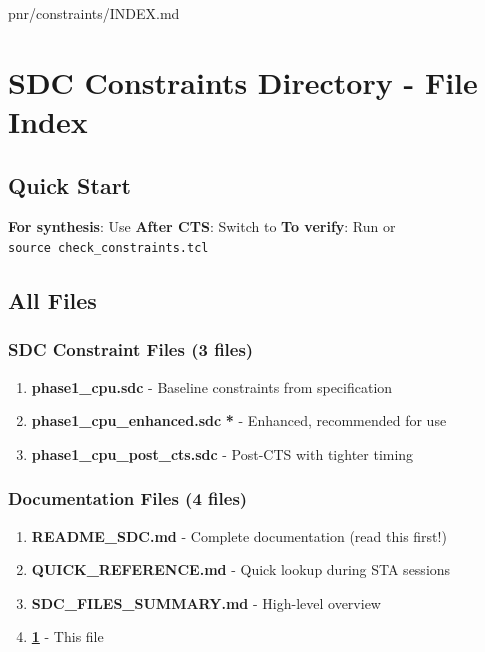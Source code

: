 \begin{relocated}{pnr/constraints/INDEX.md}
\section{SDC Constraints Directory - File Index}\label{tm:pd:constraints-index}

\subsection{Quick Start}\label{tm:pd:constraints-index:quick-start}

\textbf{For synthesis}: Use  \textbf{After
CTS}: Switch to  \textbf{To verify}: Run
 or
\texttt{source\ check\_\allowbreak{}constraints.\allowbreak{}tcl}

\subsection{All Files}\label{tm:pd:constraints-index:all-files}

\subsubsection{SDC Constraint Files (3 files)}\label{tm:pd:constraints-index:sdc-constraint-files-3-files}

\begin{enumerate}
\def\labelenumi{\arabic{enumi}.}
\tightlist
\item
  \textbf{phase1\_\allowbreak{}cpu.sdc} - Baseline constraints from
  specification
\item
  \textbf{phase1\_\allowbreak{}cpu\_\allowbreak{}enhanced.sdc}
  \textbf{*} - Enhanced, recommended for use
\item
  \textbf{phase1\_\allowbreak{}cpu\_\allowbreak{}post\_\allowbreak{}cts.sdc}
  - Post-CTS with tighter timing
\end{enumerate}

\subsubsection{Documentation Files (4 files)}\label{tm:pd:constraints-index:documentation-files-4-files}

\begin{enumerate}
\def\labelenumi{\arabic{enumi}.}
\setcounter{enumi}{3}
\tightlist
\item
  \textbf{README\_\allowbreak{}SDC.md} - Complete documentation (read
  this first!)
\item
  \textbf{QUICK\_\allowbreak{}REFERENCE.md} - Quick lookup during STA
  sessions
\item
  \textbf{SDC\_\allowbreak{}FILES\_\allowbreak{}SUMMARY.md} - High-level
  overview
\item
  \textbf{\cref{tm:pd:constraints-index}} - This file
\end{enumerate}


\end{relocated}

